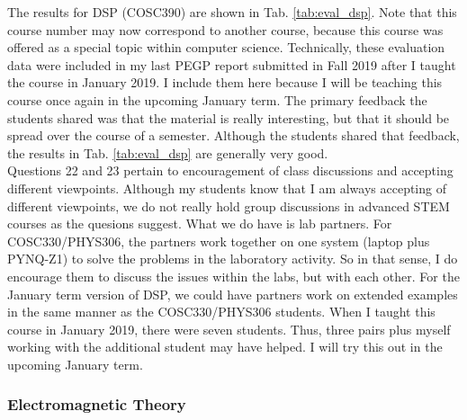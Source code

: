 \documentclass[../../main.tex]{subfiles}
\begin{document}
The results for DSP (COSC390) are shown in Tab. \ref{tab:eval_dsp}.  Note that this course number may now correspond to another course, because this course was offered as a special topic within computer science.  Technically, these evaluation data were included in my last PEGP report submitted in Fall 2019 after I taught the course in January 2019.  I include them here because I will be teaching this course once again in the upcoming January term.  The primary feedback the students shared was that the material is really interesting, but that it should be spread over the course of a semester.  Although the students shared that feedback, the results in Tab. \ref{tab:eval_dsp} are generally very good.
\\
\vspace{0.25cm}
Questions 22 and 23 pertain to encouragement of class discussions and accepting different viewpoints.  Although my students know that I am always accepting of different viewpoints, we do not really hold group discussions in advanced STEM courses as the quesions suggest.  What we do have is lab partners. For COSC330/PHYS306, the partners work together on one system (laptop plus PYNQ-Z1) to solve the problems in the laboratory activity.  So in that sense, I do encourage them to discuss the issues within the labs, but with each other.  For the January term version of DSP, we could have partners work on extended examples in the same manner as the COSC330/PHYS306 students.  When I taught this course in January 2019, there were seven students.  Thus, three pairs plus myself working with the additional student may have helped.  I will try this out in the upcoming January term.

\subsubsection{Electromagnetic Theory}
\end{document}
